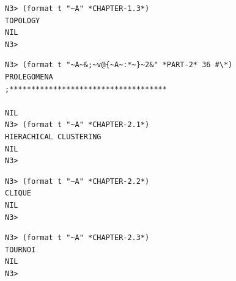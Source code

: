 \documentclass{article}
\begin{document}
\begin{lstlisting}[language=sectitle]
N3> (format t "~A" *CHAPTER-1.3*)
TOPOLOGY
NIL
N3> 
\end{lstlisting}
\label{topology}

\bigskip

\bigskip
\bigskip

\newpage
\begin{lstlisting}[language=sectitle]
N3> (format t "~A~&;~v@{~A~:*~}~2&" *PART-2* 36 #\*)
PROLEGOMENA
;************************************

NIL
N3> (format t "~A" *CHAPTER-2.1*)
HIERACHICAL CLUSTERING
NIL
N3> 
\end{lstlisting}
{}

\bigskip

\bigskip
\bigskip

\begin{lstlisting}[language=sectitle]
N3> (format t "~A" *CHAPTER-2.2*)
CLIQUE
NIL
N3> 
\end{lstlisting}

\bigskip

\bigskip
\bigskip

\begin{lstlisting}[language=sectitle]
N3> (format t "~A" *CHAPTER-2.3*)
TOURNOI
NIL
N3> 
\end{lstlisting}

\bigskip

\bigskip
\bigskip
\end{document}
